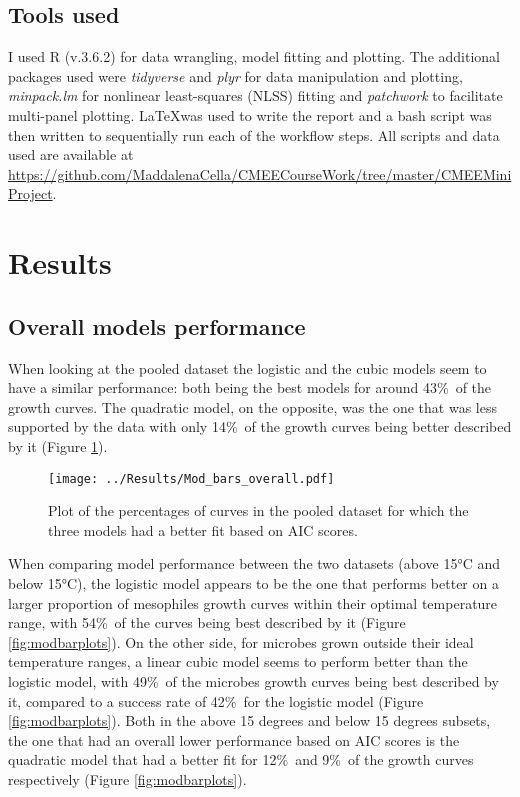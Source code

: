 \documentclass[a4paper]{article}
\begin{document}
    \subsection{Tools used}
    I used R (v.3.6.2) \citep{Rcit} for data wrangling, model fitting and plotting. The additional packages used were \textit{tidyverse} \citep{tidyverse} and \textit{plyr} for data manipulation and plotting, \textit{minpack.lm} \citep{minpack.lm} for nonlinear least-squares (NLSS) fitting and \textit{patchwork} \citep{patchwork} to facilitate multi-panel plotting.
	\LaTeX was used to write the report and a bash script was then written to sequentially run each of the workflow steps. All scripts and data used are available at \url{https://github.com/MaddalenaCella/CMEECourseWork/tree/master/CMEEMiniProject}.

\section{Results}

    \subsection{Overall models performance}
When looking at the pooled dataset the logistic and the cubic models seem to have a similar performance: both being the best models for around 43\%\ of the growth curves. The quadratic model, on the opposite, was the one that was less supported by the data with only 14\%\ of the growth curves being better described by it (Figure \ref{fig:overallbarplots}).

\begin{figure}
    \centering
    \texttt{[image: ../Results/Mod\_bars\_overall.pdf]}
\caption{Plot of the percentages of curves in the pooled dataset for which the three models had a better fit based on AIC scores.}
    \label{fig:overallbarplots}
\end{figure}

When comparing model performance between the two datasets (above 15°C and below 15°C), the logistic model appears to be the one that performs better on a larger proportion of mesophiles growth curves within their optimal temperature range, with 54\%\ of the curves being best described by it (Figure \ref{fig:modbarplots}). On the other side, for microbes grown outside their ideal temperature ranges, a linear cubic model seems to perform better than the logistic model, with 49\%\ of the microbes growth curves being best described by it, compared to a success rate of 42\%\ for the logistic model (Figure \ref{fig:modbarplots}). 
Both in the above 15 degrees and below 15 degrees subsets, the one that had an overall lower performance based on AIC scores is the quadratic model that had a better fit for 12\%\ and 9\%\ of the growth curves respectively (Figure \ref{fig:modbarplots}). \par
\end{document}
